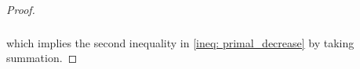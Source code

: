 \documentclass[10pt]{article}
\theoremstyle{remark}
\def\setF{\mathscr{F}} %
\newcommand{\E}{\mathbb{E}}
\newcommand{\norm}[1]{\left\|#1\right\|}
\newcommand{\bfone}{\mathbf{1}}
\newcommand{\blue}[1]{\textcolor{blue}{#1}}
\def\<#1,#2>{\left\langle #1,#2\right\rangle}
\begin{document}
\begin{proof}
\begin{align}
\begin{aligned}
    \end{aligned}
\end{align}
which implies the second inequality in \eqref{ineq: primal_decrease} by taking summation.

\end{proof}
\end{document}
